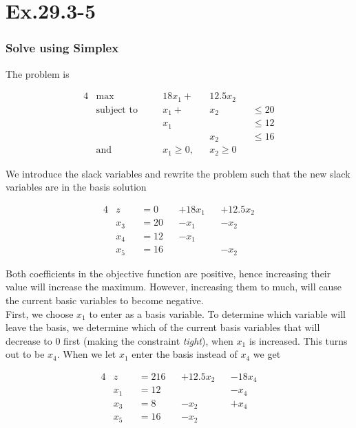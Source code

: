 \section*{Ex.29.3-5}
\subsubsection*{Solve using Simplex}

The problem is

\begin{alignat*}{4}
&\max              \quad && 18x_1 +    &&12.5x_2       &&         \\
&\text{subject to} \quad && x_1   +    &&    x_2       && \leq 20 \\
&                        && x_1        &&              && \leq 12 \\
&                        &&            &&    x_2       && \leq 16 \\
&\text{and} \quad        && x_1 \geq 0,&&    x_2 \geq 0&&
\end{alignat*}

We introduce the slack variables and rewrite the problem such that the new slack variables are in the basis solution

\begin{alignat*}{4}
&z     &&=  0  && +18x_1  &&+12.5x_2    \\
&x_3   &&= 20  && -x_1    &&    -x_2       \\
&x_4   &&= 12  && -x_1    &&               \\
&x_5   &&= 16  &&         &&    -x_2 
\end{alignat*}

Both coefficients in the objective function are positive, hence increasing their value will increase the maximum. However, increasing them to much, will cause the current basic variables to become negative.
\\
First, we choose $x_1$ to enter as a basis variable. To determine which variable will leave the basis, we determine which of the current basis variables that will decrease to 0 first (making the constraint \textit{tight}), when $x_1$ is increased. This turns out to be $x_4$. When we let $x_1$ enter the basis instead of $x_4$ we get

\begin{alignat*}{4}
&z     &&=  216  && + 12.5 x_2 &&   -18x_4    \\
&x_1   &&= 12    &&            &&     -x_4       \\
&x_3   &&= 8     &&       -x_2 &&     +x_4       \\
&x_5   &&= 16    &&       -x_2 &&    
\end{alignat*}

